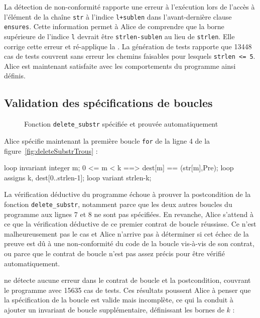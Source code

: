 La détection de non-conformité rapporte une erreur à l'exécution lors de l'accès
à l'élément de la chaîne \lstinline{str} à l'indice \lstinline{l+sublen} dans
l'avant-dernière clause \lstinline{ensures}.
Cette information permet à Alice de comprendre que la borne supérieure de
l'indice \lstinline'l' devrait être \lstinline{strlen-sublen} au lieu de
\lstinline{strlen}.
Elle corrige cette erreur et ré-applique la \NCD.
La génération de tests rapporte que 13448 cas de tests couvrent sans erreur les
chemins faisables pour lesquels \lstinline{strlen <= 5}.
Alice est maintenant satisfaite avec les comportements du programme ainsi
définis.


\subsection{Validation des spécifications de boucles}
\label{sec:ncd-incr}


\begin{figure}[bt]
  
  \vspace{-3mm}
  \caption{Fonction \lstinline{delete_substr} spécifiée
    et prouvée automatiquement
  }
  \vspace{-3mm}
  \label{lst:delete-substr-full}
\end{figure}

Alice spécifie maintenant la première boucle \lstinline'for' de la ligne 4 de la
figure~\ref{fig:deleteSubstrTrous} :

\begin{pretty-codeACSL}
loop invariant \forall integer m; 0 <= m < k ==> dest[m] == \at(str[m],Pre);
loop assigns k, dest[0..strlen-1];
loop variant strlen-k;
\end{pretty-codeACSL}

La vérification déductive du programme échoue à prouver la postcondition de la
fonction \lstinline{delete_substr}, notamment parce que les deux autres boucles
du programme aux lignes 7 et 8 ne sont pas spécifiées.
En revanche, Alice s'attend à ce que la vérification déductive de ce premier
contrat de boucle réussisse.
Ce n'est malheureusement pas le cas et Alice n'arrive pas à déterminer si cet
échec de la preuve est dû à une non-conformité du code de la boucle vis-à-vis de
son contrat, ou parce que le contrat de boucle n'est pas assez précis pour être
vérifié automatiquement.

\NCD ne détecte aucune erreur dans le contrat de boucle et la postcondition,
couvrant le programme avec 15635 cas de tests.
Ces résultats poussent Alice à penser que la spécification de la boucle est
valide mais incomplète, ce qui la conduit à ajouter un invariant de boucle
supplémentaire, définissant les bornes de $k$ : 

